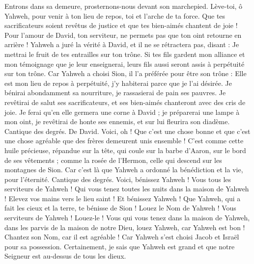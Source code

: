 \begin{multicols}{2}
Entrons dans sa demeure, prosternons-nous devant son marchepied.
Lève-toi, ô Yahweh, pour venir à ton lieu de repos, toi et l'arche de ta force.
Que tes sacrificateurs soient revêtus de justice et que tes bien-aimés chantent de joie !
Pour l'amour de David, ton serviteur, ne permets pas que ton oint retourne en arrière !
Yahweh a juré la vérité à David, et il ne se rétractera pas, disant : Je mettrai le fruit de tes entrailles sur ton trône.
Si tes fils gardent mon alliance et mon témoignage que je leur enseignerai, leurs fils aussi seront assis à perpétuité sur ton trône.
Car Yahweh a choisi Sion, il l'a préférée pour être son trône :
Elle est mon lieu de repos à perpétuité, j'y habiterai parce que je l'ai désirée.
Je bénirai abondamment sa nourriture, je rassasierai de pain ses pauvres.
Je revêtirai de salut ses sacrificateurs, et ses bien-aimés chanteront avec des cris de joie.
Je ferai qu'en elle germera une corne à David ; je préparerai une lampe à mon oint,
je revêtirai de honte ses ennemis, et sur lui fleurira son diadème.
\VerseOne{}Cantique des degrés. De David. Voici, oh ! Que c'est une chose bonne et que c'est une chose agréable que des frères demeurent unis ensemble !
C'est comme cette huile précieuse, répandue sur la tête, qui coule sur la barbe d'Aaron, sur le bord de ses vêtements ;
comme la rosée de l'Hermon, celle qui descend sur les montagnes de Sion. Car c'est là que Yahweh a ordonné la bénédiction et la vie, pour l'éternité.
\VerseOne{}Cantique des degrés. Voici, bénissez Yahweh ! Vous tous les serviteurs de Yahweh ! Qui vous tenez toutes les nuits dans la maison de Yahweh !
Elevez vos mains vers le lieu saint ! Et bénissez Yahweh !
Que Yahweh, qui a fait les cieux et la terre, te bénisse de Sion !
\VerseOne{}Louez le Nom de Yahweh ! Vous serviteurs de Yahweh ! Louez-le !
Vous qui vous tenez dans la maison de Yahweh, dans les parvis de la maison de notre Dieu,
louez Yahweh, car Yahweh est bon ! Chantez son Nom, car il est agréable !
Car Yahweh s'est choisi Jacob et Israël pour sa possession.
Certainement, je sais que Yahweh est grand et que notre Seigneur est au-dessus de tous les dieux.

\end{multicols}
